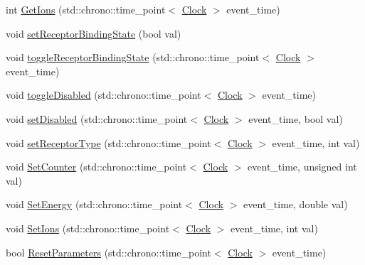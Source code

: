 \begin{DoxyCompactItemize}
\item 
int \mbox{\hyperlink{classMembraneChannel_af20c4ca6a3708c86122e7118a29952fd}{Get\+Ions}} (std\+::chrono\+::time\+\_\+point$<$ \mbox{\hyperlink{universe_8h_a0ef8d951d1ca5ab3cfaf7ab4c7a6fd80}{Clock}} $>$ event\+\_\+time)
\item 
void \mbox{\hyperlink{classMembraneChannel_a9f5c69ab1f4dce6113fceebaaa4f15f4}{set\+Receptor\+Binding\+State}} (bool val)
\item 
void \mbox{\hyperlink{classMembraneChannel_a289ec477e64eec5d2a1f88f4a677650c}{toggle\+Receptor\+Binding\+State}} (std\+::chrono\+::time\+\_\+point$<$ \mbox{\hyperlink{universe_8h_a0ef8d951d1ca5ab3cfaf7ab4c7a6fd80}{Clock}} $>$ event\+\_\+time)
\item 
void \mbox{\hyperlink{classMembraneChannel_aabbadec31782704dd497848154dfe0fc}{toggle\+Disabled}} (std\+::chrono\+::time\+\_\+point$<$ \mbox{\hyperlink{universe_8h_a0ef8d951d1ca5ab3cfaf7ab4c7a6fd80}{Clock}} $>$ event\+\_\+time)
\item 
void \mbox{\hyperlink{classMembraneChannel_aed2055857888506a35c09bdcc265799a}{set\+Disabled}} (std\+::chrono\+::time\+\_\+point$<$ \mbox{\hyperlink{universe_8h_a0ef8d951d1ca5ab3cfaf7ab4c7a6fd80}{Clock}} $>$ event\+\_\+time, bool val)
\item 
void \mbox{\hyperlink{classMembraneChannel_a7f40594845bb0aa6a03fd9c08a836d7e}{set\+Receptor\+Type}} (std\+::chrono\+::time\+\_\+point$<$ \mbox{\hyperlink{universe_8h_a0ef8d951d1ca5ab3cfaf7ab4c7a6fd80}{Clock}} $>$ event\+\_\+time, int val)
\item 
void \mbox{\hyperlink{classMembraneChannel_a61931feff8f3bb485eeb5c80125bb732}{Set\+Counter}} (std\+::chrono\+::time\+\_\+point$<$ \mbox{\hyperlink{universe_8h_a0ef8d951d1ca5ab3cfaf7ab4c7a6fd80}{Clock}} $>$ event\+\_\+time, unsigned int val)
\item 
void \mbox{\hyperlink{classMembraneChannel_aaa2d816d3887b6292d995a83130a4834}{Set\+Energy}} (std\+::chrono\+::time\+\_\+point$<$ \mbox{\hyperlink{universe_8h_a0ef8d951d1ca5ab3cfaf7ab4c7a6fd80}{Clock}} $>$ event\+\_\+time, double val)
\item 
void \mbox{\hyperlink{classMembraneChannel_a1fe0c61eccbb6aa0d905ead27e8337bd}{Set\+Ions}} (std\+::chrono\+::time\+\_\+point$<$ \mbox{\hyperlink{universe_8h_a0ef8d951d1ca5ab3cfaf7ab4c7a6fd80}{Clock}} $>$ event\+\_\+time, int val)
\item 
bool \mbox{\hyperlink{classMembraneChannel_a5982040b46efe5e2b824d1cf4dead25e}{Reset\+Parameters}} (std\+::chrono\+::time\+\_\+point$<$ \mbox{\hyperlink{universe_8h_a0ef8d951d1ca5ab3cfaf7ab4c7a6fd80}{Clock}} $>$ event\+\_\+time)

\end{DoxyCompactItemize}
